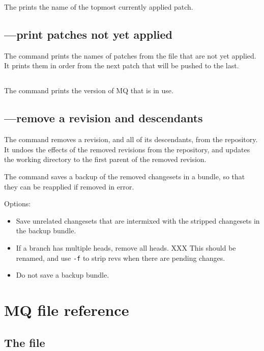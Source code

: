The  prints the name of the topmost currently applied
patch.

\subsection{---print patches not yet applied}

The  command prints the names of patches from the
 file that are not yet applied.  It prints them in
order from the next patch that will be pushed to the last.

\subsection{}

The  command prints the version of MQ that is in use.

\subsection{---remove a revision and descendants}

The  command removes a revision, and all of its
descendants, from the repository.  It undoes the effects of the
removed revisions from the repository, and updates the working
directory to the first parent of the removed revision.

The  command saves a backup of the removed changesets in
a bundle, so that they can be reapplied if removed in error.

Options:
\begin{itemize}
\item[\hgopt{strip}{-b}] Save unrelated changesets that are intermixed
  with the stripped changesets in the backup bundle.
\item[\hgopt{strip}{-f}] If a branch has multiple heads, remove all
  heads. XXX This should be renamed, and use \texttt{-f} to strip revs
  when there are pending changes.
\item[\hgopt{strip}{-n}] Do not save a backup bundle.
\end{itemize}

\section{MQ file reference}

\subsection{The  file}

